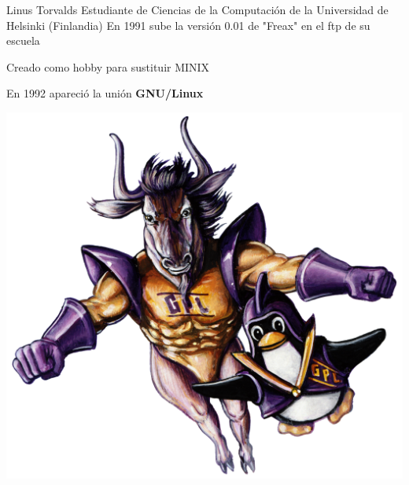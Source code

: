 \documentclass{beamer}
\begin{document}
\begin{frame}{Linus Torvalds}
Estudiante de Ciencias de la Computación de la Universidad de Helsinki (Finlandia)
En 1991 sube la versión 0.01 de "Freax" en el ftp de su escuela

Creado como hobby para sustituir MINIX

En 1992 apareció la unión \textbf{GNU/Linux}

\includegraphics[scale=0.12]{tux_gnu.png}
\end{frame}
\end{document}
